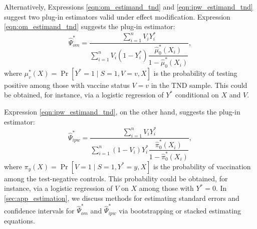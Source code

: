 \documentclass[11pt]{article}
\begin{document}
Alternatively, Expressions \ref{eqn:om_estimand_tnd} and \ref{eqn:ipw_estimand_tnd} suggest two plug-in estimators valid under effect modification. Expression \ref{eqn:om_estimand_tnd} suggests the plug-in estimator:
\begin{equation}\label{eqn:om_estimator}
    \widehat{\Psi}_{om}^* = \dfrac{\sum_{i=1}^n V_i Y^*_i}{\sum_{i=1}^n V_i (1 - Y_i^*)\dfrac{\widehat{\mu}^*_0(X_i)}{1 - \widehat{\mu}^*_0(X_i)}},
\end{equation}
where $\mu^*_v(X) = \Pr[Y^* =1 \mid S=1, V=v, X]$ is the probability of testing positive among those with vaccine status $V =v$ in the TND sample. This could be obtained, for instance, via a logistic regression of $Y^*$ conditional on $X$ and $V$.

Expression \ref{eqn:ipw_estimand_tnd}, on the other hand, suggests the plug-in estimator:
\begin{equation}\label{eqn:ipw_estimator}
    \widehat{\Psi}_{ipw}^* = \dfrac{\sum_{i=1}^n V_i Y^*_i}{\sum_{i=1}^n (1 - V_i) Y^*_i \dfrac{\widehat\pi^*_0(X_i)}{1 - \widehat\pi^*_0(X_i)}},
\end{equation}
where $\pi_y(X) = \Pr[V=1\mid S=1, Y^*=y, X]$ is the probability of vaccination among the test-negative controls. This probability could be obtained, for instance, via a logistic regression of $V$ on $X$ among those with $Y^*=0$. In \ref{sec:app_estimation}, we discuss methods for estimating standard errors and confidence intervals for $\widehat{\Psi}_{om}^*$ and $\widehat{\Psi}_{ipw}^*$ via bootstrapping or stacked estimating equations. 
\end{document}
